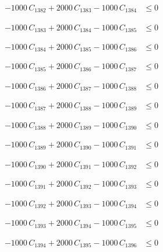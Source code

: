 \documentclass[a4paper,11pt]{article}
\begin{document}
\begin{align}
-1000\,C_{1382} + 2000\,C_{1383} - 1000\,C_{1384} &\leq 0 \nonumber
\end{align}

\begin{align}
-1000\,C_{1383} + 2000\,C_{1384} - 1000\,C_{1385} &\leq 0 \nonumber
\end{align}

\begin{align}
-1000\,C_{1384} + 2000\,C_{1385} - 1000\,C_{1386} &\leq 0 \nonumber
\end{align}

\begin{align}
-1000\,C_{1385} + 2000\,C_{1386} - 1000\,C_{1387} &\leq 0 \nonumber
\end{align}

\begin{align}
-1000\,C_{1386} + 2000\,C_{1387} - 1000\,C_{1388} &\leq 0 \nonumber
\end{align}

\begin{align}
-1000\,C_{1387} + 2000\,C_{1388} - 1000\,C_{1389} &\leq 0 \nonumber
\end{align}

\begin{align}
-1000\,C_{1388} + 2000\,C_{1389} - 1000\,C_{1390} &\leq 0 \nonumber
\end{align}

\begin{align}
-1000\,C_{1389} + 2000\,C_{1390} - 1000\,C_{1391} &\leq 0 \nonumber
\end{align}

\begin{align}
-1000\,C_{1390} + 2000\,C_{1391} - 1000\,C_{1392} &\leq 0 \nonumber
\end{align}

\begin{align}
-1000\,C_{1391} + 2000\,C_{1392} - 1000\,C_{1393} &\leq 0 \nonumber
\end{align}

\begin{align}
-1000\,C_{1392} + 2000\,C_{1393} - 1000\,C_{1394} &\leq 0 \nonumber
\end{align}

\begin{align}
-1000\,C_{1393} + 2000\,C_{1394} - 1000\,C_{1395} &\leq 0 \nonumber
\end{align}

\begin{align}
-1000\,C_{1394} + 2000\,C_{1395} - 1000\,C_{1396} &\leq 0 \nonumber
\end{align}
\end{document}
